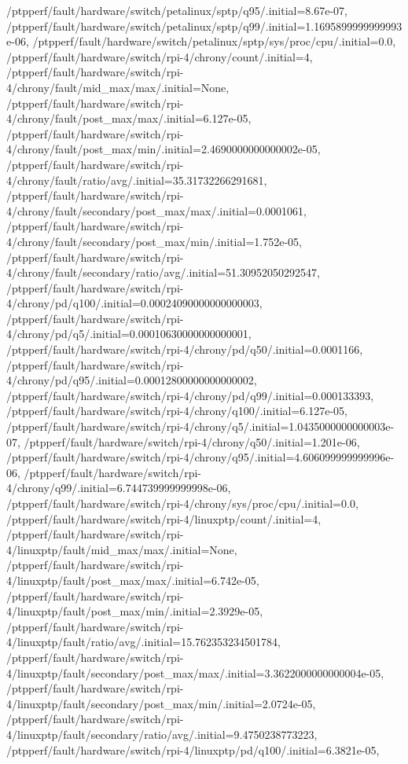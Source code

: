 {    /ptpperf/fault/hardware/switch/petalinux/sptp/q95/.initial=8.67e-07,
    /ptpperf/fault/hardware/switch/petalinux/sptp/q99/.initial=1.1695899999999993e-06,
    /ptpperf/fault/hardware/switch/petalinux/sptp/sys/proc/cpu/.initial=0.0,
    /ptpperf/fault/hardware/switch/rpi-4/chrony/count/.initial=4,
    /ptpperf/fault/hardware/switch/rpi-4/chrony/fault/mid_max/max/.initial=None,
    /ptpperf/fault/hardware/switch/rpi-4/chrony/fault/post_max/max/.initial=6.127e-05,
    /ptpperf/fault/hardware/switch/rpi-4/chrony/fault/post_max/min/.initial=2.4690000000000002e-05,
    /ptpperf/fault/hardware/switch/rpi-4/chrony/fault/ratio/avg/.initial=35.31732266291681,
    /ptpperf/fault/hardware/switch/rpi-4/chrony/fault/secondary/post_max/max/.initial=0.0001061,
    /ptpperf/fault/hardware/switch/rpi-4/chrony/fault/secondary/post_max/min/.initial=1.752e-05,
    /ptpperf/fault/hardware/switch/rpi-4/chrony/fault/secondary/ratio/avg/.initial=51.30952050292547,
    /ptpperf/fault/hardware/switch/rpi-4/chrony/pd/q100/.initial=0.00024090000000000003,
    /ptpperf/fault/hardware/switch/rpi-4/chrony/pd/q5/.initial=0.00010630000000000001,
    /ptpperf/fault/hardware/switch/rpi-4/chrony/pd/q50/.initial=0.0001166,
    /ptpperf/fault/hardware/switch/rpi-4/chrony/pd/q95/.initial=0.00012800000000000002,
    /ptpperf/fault/hardware/switch/rpi-4/chrony/pd/q99/.initial=0.000133393,
    /ptpperf/fault/hardware/switch/rpi-4/chrony/q100/.initial=6.127e-05,
    /ptpperf/fault/hardware/switch/rpi-4/chrony/q5/.initial=1.0435000000000003e-07,
    /ptpperf/fault/hardware/switch/rpi-4/chrony/q50/.initial=1.201e-06,
    /ptpperf/fault/hardware/switch/rpi-4/chrony/q95/.initial=4.606099999999996e-06,
    /ptpperf/fault/hardware/switch/rpi-4/chrony/q99/.initial=6.744739999999998e-06,
    /ptpperf/fault/hardware/switch/rpi-4/chrony/sys/proc/cpu/.initial=0.0,
    /ptpperf/fault/hardware/switch/rpi-4/linuxptp/count/.initial=4,
    /ptpperf/fault/hardware/switch/rpi-4/linuxptp/fault/mid_max/max/.initial=None,
    /ptpperf/fault/hardware/switch/rpi-4/linuxptp/fault/post_max/max/.initial=6.742e-05,
    /ptpperf/fault/hardware/switch/rpi-4/linuxptp/fault/post_max/min/.initial=2.3929e-05,
    /ptpperf/fault/hardware/switch/rpi-4/linuxptp/fault/ratio/avg/.initial=15.762353234501784,
    /ptpperf/fault/hardware/switch/rpi-4/linuxptp/fault/secondary/post_max/max/.initial=3.3622000000000004e-05,
    /ptpperf/fault/hardware/switch/rpi-4/linuxptp/fault/secondary/post_max/min/.initial=2.0724e-05,
    /ptpperf/fault/hardware/switch/rpi-4/linuxptp/fault/secondary/ratio/avg/.initial=9.4750238773223,
    /ptpperf/fault/hardware/switch/rpi-4/linuxptp/pd/q100/.initial=6.3821e-05,
}
